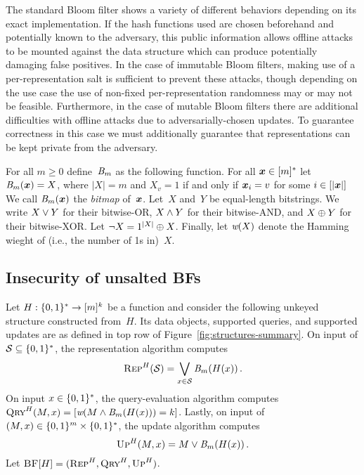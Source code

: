 
%
%
The standard Bloom filter shows a variety of different behaviors depending on
its exact implementation. If the hash functions used are chosen beforehand and
potentially known to the adversary, this public information allows offline
attacks to be mounted against the data structure which can produce potentially
damaging false positives. In the case of immutable Bloom filters, making use of
a per-representation salt is sufficient to prevent these attacks, though
depending on the use case the use of non-fixed per-representation randomness may
or may not be feasible. Furthermore, in the case of mutable Bloom filters there
are additional difficulties with offline attacks due to adversarially-chosen
updates. To guarantee correctness in this case we must additionally guarantee
that representations can be kept private from the adversary.

\medskip
{}
%
%
For all $m\geq0$ define~$\textit{B}_m$ as the following function.
For all $\v.x\in[m]^*$ let $\bmap_m(\v.x) = X$, where
$|X|=m$ and $X_v=1$ if and only if $\v.x_i = v$ for some $i\in[|\v.x|]$
%
We call $\bmap_m(\v.x)$ the \emph{bitmap} of~$\v.x$.
%
Let~$X$ and~$Y$ be equal-length bitstrings. We write $X \vee Y$ for their
bitwise-OR, $X \wedge Y$ for their bitwise-AND, and $X \mathbin{\oplus} Y$ for their
bitwise-XOR. Let $\neg X = 1^{|X|} \mathbin{\oplus} X$.
%
Finally, let $\textit{w}(X)$ denote the Hamming wieght of (i.e., the number of 1s in)~$X$.

\subsection{Insecurity of unsalted BFs}
Let $H:\{0,1\}^*\to[m]^k$ be a function and consider the following unkeyed
structure constructed from~$H$. Its data objects, supported queries, and
supported updates are as defined in top row of
Figure~\ref{fig:structures-summary}.
%
On input of $\mathcal{S}\subseteq\{0,1\}^*$, the representation algorithm computes
%
\[
  \textsc{Rep}^H(\mathcal{S}) = \bigvee_{x\in\mathcal{S}} \textit{B}_m(H(x)) \,.
\]
%
On input $x\in\{0,1\}^*$, the query-evaluation algorithm computes $\textsc{Qry}^H(M,x) =
[\textit{w}(M \wedge \textit{B}_m(H(x))) = k]$.
%
Lastly, on input of $(M, x) \in \{0,1\}^m\times\{0,1\}^*$, the update algorithm computes
%
\[
  \textsc{Up}^H(M,x)= M \vee \textit{B}_m(H(x)) \,.
\]
%
Let $\textsc{BF}[H] = (\textsc{Rep}^H, \textsc{Qry}^H, \textsc{Up}^H)$.


